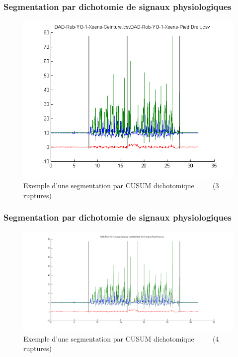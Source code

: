 \documentclass{beamer}
\begin{document}
\begin{frame}
	\frametitle{Segmentation par dichotomie de signaux physiologiques}
	\begin{figure}
		\includegraphics[scale=0.5]{dikt-seg3.png}
		\caption{Exemple d'une segmentation par CUSUM dichotomique
		~~~~
		(3 ruptures)}
	\end{figure}
\end{frame}

\begin{frame}
	\frametitle{Segmentation par dichotomie de signaux physiologiques}
	\begin{figure}
		\includegraphics[scale=0.3]{dikt-seg4.png}
		\caption{Exemple d'une segmentation par CUSUM dichotomique
		~~~~
		(4 ruptures)}
	\end{figure}
\end{frame}
\end{document}
